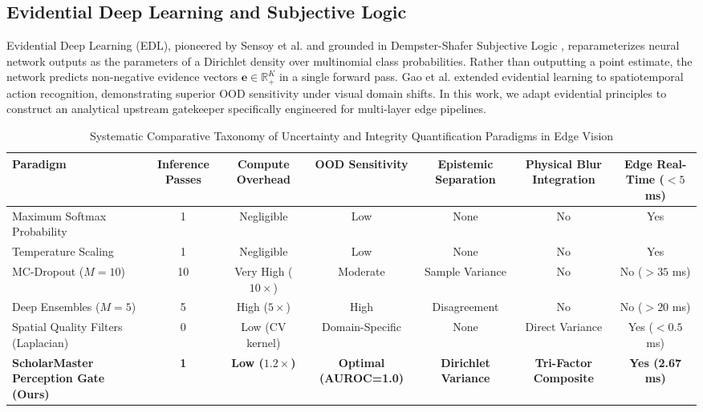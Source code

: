 \documentclass[10pt,journal,compsoc]{IEEEtran}
\begin{document}
\subsection{Evidential Deep Learning and Subjective Logic}
Evidential Deep Learning (EDL), pioneered by Sensoy et al. \cite{sensoy2018evidential} and grounded in Dempster-Shafer Subjective Logic \cite{josang2016subjective}, reparameterizes neural network outputs as the parameters of a Dirichlet density over multinomial class probabilities. Rather than outputting a point estimate, the network predicts non-negative evidence vectors $\mathbf{e} \in \mathbb{R}_+^K$ in a single forward pass. Gao et al. \cite{gao2023evidential} extended evidential learning to spatiotemporal action recognition, demonstrating superior OOD sensitivity under visual domain shifts. In this work, we adapt evidential principles to construct an analytical upstream gatekeeper specifically engineered for multi-layer edge pipelines.

\begin{table}[t]
\caption{Systematic Comparative Taxonomy of Uncertainty and Integrity Quantification Paradigms in Edge Vision}
\label{tab:uncertainty_taxonomy}
\centering
\begin{tabular}{lcccccc}
\toprule
\textbf{Paradigm} & \textbf{Inference Passes} & \textbf{Compute Overhead} & \textbf{OOD Sensitivity} & \textbf{Epistemic Separation} & \textbf{Physical Blur Integration} & \textbf{Edge Real-Time ($<5$ ms)} \\
\midrule
Maximum Softmax Probability \cite{hendrycks2017baseline} & 1 & Negligible & Low & None & No & Yes \\
Temperature Scaling \cite{guo2017calibration} & 1 & Negligible & Low & None & No & Yes \\
MC-Dropout ($M=10$) \cite{gal2016dropout} & 10 & Very High ($10\times$) & Moderate & Sample Variance & No & No ($>35$ ms) \\
Deep Ensembles ($M=5$) \cite{lakshminarayanan2017simple} & 5 & High ($5\times$) & High & Disagreement & No & No ($>20$ ms) \\
Spatial Quality Filters (Laplacian) & 0 & Low (CV kernel) & Domain-Specific & None & Direct Variance & Yes ($<0.5$ ms) \\
\textbf{ScholarMaster Perception Gate (Ours)} & \textbf{1} & \textbf{Low ($1.2\times$)} & \textbf{Optimal (AUROC=1.0)} & \textbf{Dirichlet Variance} & \textbf{Tri-Factor Composite} & \textbf{Yes (2.67 ms)} \\
\bottomrule
\end{tabular}
\end{table}
\end{document}
